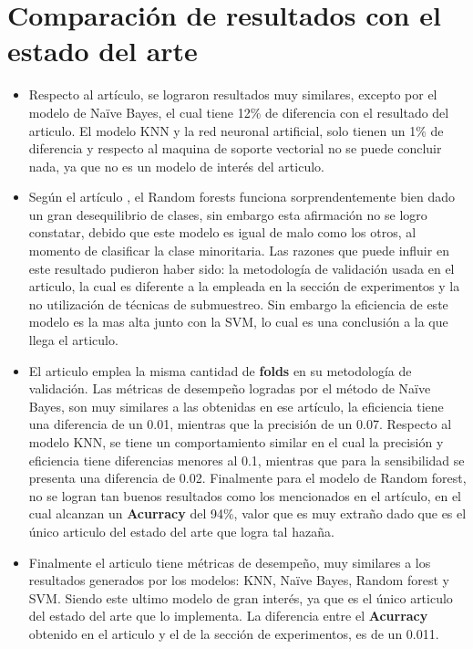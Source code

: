 \documentclass[conference]{IEEEtran}
\begin{document}
\section{Comparación de resultados con el estado del arte}
\begin{itemize}
\item Respecto al artículo\cite{articulo1}, se lograron resultados muy similares, excepto por el modelo de Naïve Bayes, el cual tiene 12\% de diferencia con el resultado del articulo. El modelo KNN y la red neuronal artificial, solo tienen un 1\% de diferencia y respecto al maquina de soporte vectorial no se puede concluir nada, ya que no es un modelo de interés del articulo. 

\item Según el artículo \cite{articulo2}, el Random forests funciona sorprendentemente bien dado un gran desequilibrio de clases, sin embargo esta afirmación no se logro constatar, debido que este modelo es igual de malo como los otros, al momento de clasificar la clase minoritaria. Las razones que puede influir en este resultado pudieron haber sido: la metodología de validación usada en el articulo, la cual es diferente a la empleada en la sección de experimentos y la no utilización de técnicas de submuestreo. Sin embargo la eficiencia de este modelo es la mas alta junto con la SVM, lo cual es una conclusión a la que llega el articulo.

\item El articulo \cite{articulo3} emplea la misma cantidad de \textbf{folds} en su metodología de validación. Las métricas de desempeño logradas por el método de Naïve Bayes, son muy similares a las obtenidas en ese artículo, la eficiencia tiene una diferencia de un 0.01, mientras que la precisión de un 0.07. Respecto al modelo KNN, se tiene un comportamiento similar en el cual la precisión y eficiencia tiene diferencias menores al 0.1, mientras que para la sensibilidad se presenta una diferencia de 0.02. Finalmente para el modelo de Random forest, no se logran tan buenos resultados como los mencionados en el artículo, en el cual alcanzan un  \textbf{Acurracy} del 94\%, valor que es muy extraño dado que es el único articulo del estado del arte que logra tal hazaña.

\item Finalmente el articulo  \cite{articulo4} tiene métricas de desempeño, muy similares a los resultados generados por los modelos: KNN, Naïve Bayes, Random forest y SVM. Siendo este ultimo modelo de gran interés, ya que es el único articulo del estado del arte que lo implementa. La diferencia entre el \textbf{Acurracy} obtenido en el articulo y el de la sección de experimentos, es de un 0.011.

\end{itemize}
\end{document}
